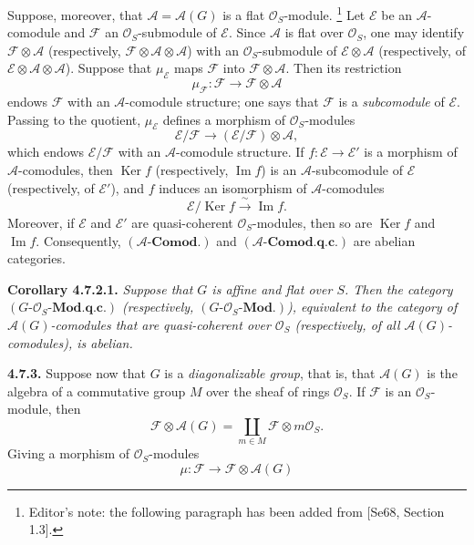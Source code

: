 Suppose, moreover, that \(\mathscr A=\mathscr A(G)\) is a flat
\(\mathcal O_S\)-module.
\footnote{Editor's note: the following paragraph has been added from
[Se68, Section 1.3].}
Let \(\mathscr E\) be an \(\mathscr A\)-comodule and \(\mathscr F\) an
\(\mathcal O_S\)-submodule of \(\mathscr E\). Since \(\mathscr A\) is
flat over \(\mathcal O_S\), one may identify
\(\mathscr F\otimes\mathscr A\) (respectively,
\(\mathscr F\otimes\mathscr A\otimes\mathscr A\)) with an
\(\mathcal O_S\)-submodule of \(\mathscr E\otimes\mathscr A\)
(respectively, of
\(\mathscr E\otimes\mathscr A\otimes\mathscr A\)). Suppose that
\(\mu_{\mathscr E}\) maps \(\mathscr F\) into
\(\mathscr F\otimes\mathscr A\). Then its restriction
\[
  \mu_{\mathscr F}:\mathscr F\longrightarrow
    \mathscr F\otimes\mathscr A
\]
endows \(\mathscr F\) with an \(\mathscr A\)-comodule structure; one
says that \(\mathscr F\) is a \emph{subcomodule} of \(\mathscr E\).
Passing to the quotient, \(\mu_{\mathscr E}\) defines a morphism of
\(\mathcal O_S\)-modules
\[
  \mathscr E/\mathscr F\longrightarrow
  (\mathscr E/\mathscr F)\otimes\mathscr A,
\]
which endows \(\mathscr E/\mathscr F\) with an
\(\mathscr A\)-comodule structure. If
\(f:\mathscr E\to\mathscr E'\) is a morphism of
\(\mathscr A\)-comodules, then \(\operatorname{Ker}f\) (respectively,
\(\operatorname{Im}f\)) is an \(\mathscr A\)-subcomodule of
\(\mathscr E\) (respectively, of \(\mathscr E'\)), and \(f\) induces
an isomorphism of \(\mathscr A\)-comodules
\[
  \mathscr E/\operatorname{Ker}f
    \xrightarrow{\ \sim\ }
  \operatorname{Im}f.
\]
Moreover, if \(\mathscr E\) and \(\mathscr E'\) are quasi-coherent
\(\mathcal O_S\)-modules, then so are \(\operatorname{Ker}f\) and
\(\operatorname{Im}f\). Consequently,
\((\mathscr A\text{-}\mathbf{Comod.})\) and
\((\mathscr A\text{-}\mathbf{Comod.q.c.})\) are abelian categories.

\medskip
\noindent\textbf{Corollary 4.7.2.1.}
\textit{Suppose that \(G\) is affine and flat over \(S\). Then the
category \((G\text{-}\mathcal O_S\text{-}\mathbf{Mod.q.c.})\)
(respectively, \((G\text{-}\mathcal O_S\text{-}\mathbf{Mod.})\)),
equivalent to the category of \(\mathscr A(G)\)-comodules that are
quasi-coherent over \(\mathcal O_S\) (respectively, of all
\(\mathscr A(G)\)-comodules), is abelian.}

\medskip
\noindent\textbf{4.7.3.}
Suppose now that \(G\) is a \emph{diagonalizable group}, that is, that
\(\mathscr A(G)\) is the algebra of a commutative group \(M\) over the
sheaf of rings \(\mathcal O_S\). If \(\mathscr F\) is an
\(\mathcal O_S\)-module, then
\[
  \mathscr F\otimes\mathscr A(G)
    =\coprod_{m\in M}\mathscr F\otimes m\mathcal O_S.
\]
Giving a morphism of \(\mathcal O_S\)-modules
\[
  \mu:\mathscr F\longrightarrow\mathscr F\otimes\mathscr A(G)
\]


